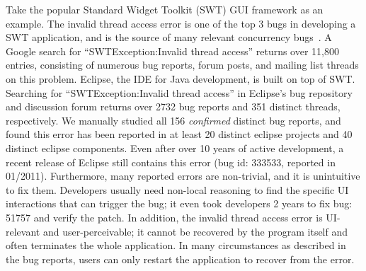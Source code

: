 Take the popular Standard Widget Toolkit (SWT) GUI framework as an example. 
The invalid thread access error is one of the top 3 bugs in developing a SWT application, and is
the source of many relevant concurrency bugs~\cite{top3bugs}.
A Google search for ``SWTException:Invalid thread access''  returns over 11,800 entries,
consisting of numerous bug reports, forum posts, and mailing list threads on
this problem. Eclipse, the IDE for Java development, is built on top of SWT.
Searching for ``SWTException:Invalid thread access'' in Eclipse's bug repository
and discussion forum returns over 2732 bug reports and 351 distinct threads, respectively. 
We manually studied all 156 \textit{confirmed} distinct bug reports, and 
found this error has been reported in at least 20 distinct eclipse projects
and 40 distinct eclipse components. Even after over 10 years of active development,
a recent release of Eclipse still contains this error (bug id: 333533, reported in 01/2011).
 Furthermore, many reported  errors are non-trivial, and it is unintuitive
to fix them. Developers usually need non-local reasoning to find the specific
UI interactions that can trigger the bug;  it even took developers 2 years
to fix bug: 51757 and verify the patch. In addition, the invalid thread access error
is UI-relevant and user-perceivable; it cannot be recovered by the program itself
and often terminates the whole application. In many circumstances as described in the bug reports,
users can only restart the application to recover from the error.




